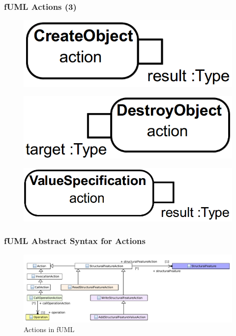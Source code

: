 \documentclass{beamer}
\begin{document}
\begin{frame}
 \frametitle{fUML Actions (3)}
\begin{figure}[h!t]
 \centering
 \includegraphics[scale=0.18]{images/fuml-actions/CreateObject.png}
\end{figure}
\begin{figure}[h!t]
 \centering
 \includegraphics[scale=0.18]{images/fuml-actions/DestroyObject.png}
\end{figure}
\begin{figure}[h!t]
 \centering
 \includegraphics[scale=0.18]{images/fuml-actions/ValueSpecification.png}
\end{figure}
\end{frame}

\begin{frame}
\frametitle{fUML Abstract Syntax for Actions}
\begin{figure}[h!t]
 \centering
 \includegraphics[scale=0.5]{images/Model_Model_Behavior}
 \caption{Actions in fUML}
 \label{fig:behavior}
\end{figure}
\end{frame}
\end{document}
